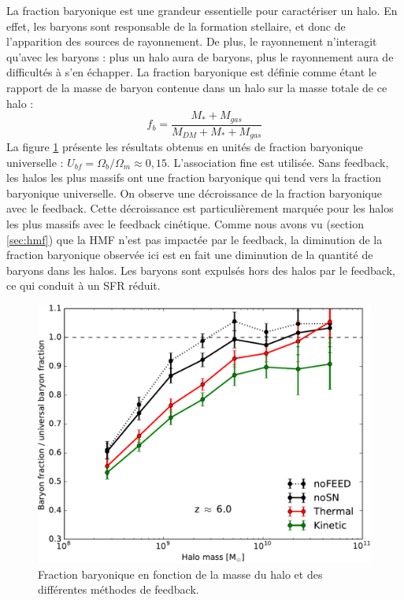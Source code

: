 La fraction baryonique est une grandeur essentielle pour caractériser un halo.
En effet, les baryons sont responsable de la formation stellaire, et donc de l'apparition des sources de rayonnement.
De plus, le rayonnement n'interagit qu'avec les baryons : plus un halo aura de baryons, plus le rayonnement aura de difficultés à s'en échapper.
La fraction baryonique est définie comme étant le rapport de la masse de baryon contenue dans un halo sur la masse totale de ce halo : 
\begin{equation}
f_b = \frac{M_* + M_{gas} }{M_{DM} + M_* + M_{gas} }
\end{equation}
La figure \ref{fig:bfrac} présente les résultats obtenus en unités de fraction baryonique universelle : $U_{bf}= \Omega_b/\Omega_m \approx 0,15$.
L'association fine est utilisée.
Sans feedback, les halos les plus massifs ont une fraction baryonique qui tend vers la fraction baryonique universelle.
On observe une décroissance de la fraction baryonique avec le feedback.
Cette décroissance est particulièrement marquée pour les halos les plus massifs avec le feedback cinétique.
Comme nous avons vu (section \ref{sec:hmf}) que la \ac{HMF} n'est pas impactée par le feedback, la diminution de la fraction baryonique observée ici est en fait une diminution de la quantité de baryons dans les halos.
Les baryons sont expulsés hors des halos par le feedback, ce qui conduit à un \ac{SFR} réduit.




\begin{figure}
		\includegraphics[width=.95\linewidth]{img/03/baryon_frac.pdf}
        \caption[Fraction baryonique]{Fraction baryonique en fonction de la masse du halo et des différentes méthodes de feedback.
 		\label{fig:bfrac}}
\end{figure}


